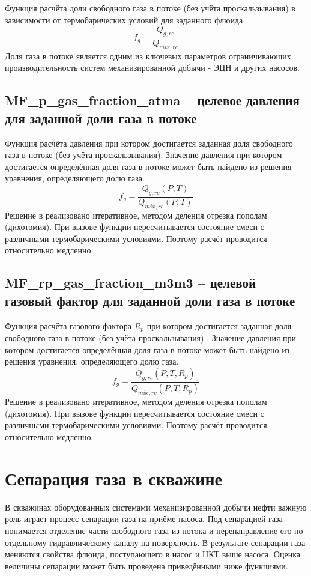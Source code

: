 Функция расчёта доли свободного газа в потоке (без учёта проскальзывания) в зависимости от термобарических условий для заданного флюида. 
$$f_g = \frac{Q_{g,rc}}{Q_{mix,rc}} $$
Доля газа в потоке является одним из ключевых параметров ограничивающих производительность систем механизированной добычи - ЭЦН и других насосов.


\subsection{MF\_p\_gas\_fraction\_atma – целевое давления для заданной доли газа в потоке}
Функция расчёта давления при котором достигается заданная доля свободного газа в потоке (без учёта проскальзывания). 
Значение давления при котором достигается определённая доля газа в потоке может быть найдено из решения уравнения, определяющего долю газа. 
$$f_g = \frac{Q_{g,rc}(P,T)}{Q_{mix,rc}(P,T)} $$
Решение в \unf реализовано итеративное, методом деления отрезка пополам (дихотомия). При вызове функции пересчитывается состояние смеси с различными термобарическими условиями. Поэтому расчёт проводится относительно медленно. 


\subsection{MF\_rp\_gas\_fraction\_m3m3 – целевой газовый фактор для заданной доли газа в потоке}
Функция расчёта газового фактора $R_p$ при котором достигается заданная доля свободного газа в потоке (без учёта проскальзывания) . 
Значение давления при котором достигается определённая доля газа в потоке может быть найдено из решения уравнения, определяющего долю газа. 
$$f_g = \frac{Q_{g,rc}(P,T,R_p)}{Q_{mix,rc}(P,T,R_p)} $$
Решение в \unf реализовано итеративное, методом деления отрезка пополам (дихотомия). При вызове функции пересчитывается состояние смеси с различными термобарическими условиями. Поэтому расчёт проводится относительно медленно. 


\section{Сепарация газа в скважине}
В скважинах оборудованных системами механизированной добычи нефти важную роль играет процесс сепарации газа на приёме насоса. Под сепарацией газа понимается отделение части свободного газа из потока и перенаправление его по отдельному гидравлическому каналу на поверхность. В результате сепарации газа меняются свойства флюида, поступающего в насос и НКТ выше насоса. Оценка величины сепарации может быть проведена приведёнными ниже функциями.

